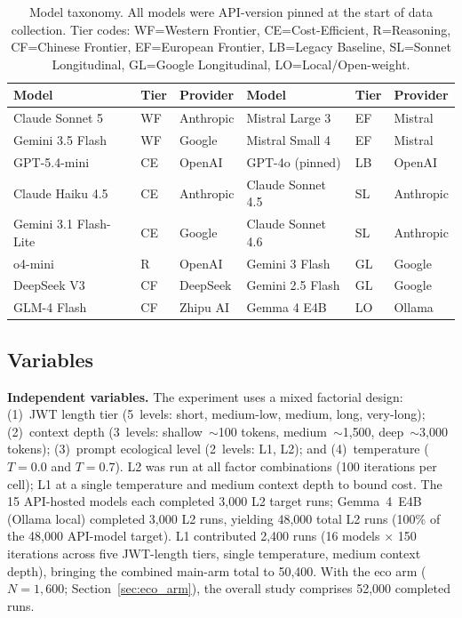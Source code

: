 \begin{table}[t]
\centering
\small
\vspace{-4pt}\caption{Model taxonomy. All models were API-version pinned at the start of
data collection. Tier codes: WF=Western Frontier, CE=Cost-Efficient,
R=Reasoning, CF=Chinese Frontier, EF=European Frontier, LB=Legacy Baseline,
SL=Sonnet Longitudinal, GL=Google Longitudinal, LO=Local/Open-weight.}
\label{tab:models}
\setlength{\tabcolsep}{6pt}
\begin{tabular}{@{}lll@{\qquad\qquad}lll@{}}
\toprule
\textbf{Model} & \textbf{Tier} & \textbf{Provider} &
\textbf{Model} & \textbf{Tier} & \textbf{Provider} \\
\midrule
Claude Sonnet 5       & WF & Anthropic  & Mistral Large 3       & EF & Mistral \\
Gemini 3.5 Flash      & WF & Google     & Mistral Small 4       & EF & Mistral \\
GPT-5.4-mini          & CE & OpenAI     & GPT-4o (pinned)       & LB & OpenAI \\
Claude Haiku 4.5      & CE & Anthropic  & Claude Sonnet 4.5     & SL & Anthropic \\
Gemini 3.1 Flash-Lite & CE & Google     & Claude Sonnet 4.6     & SL & Anthropic \\
o4-mini               & R  & OpenAI     & Gemini 3 Flash        & GL & Google \\
DeepSeek V3           & CF & DeepSeek   & Gemini 2.5 Flash      & GL & Google \\
GLM-4 Flash           & CF & Zhipu AI   & Gemma 4 E4B           & LO & Ollama \\
\bottomrule
\end{tabular}
\end{table}

\subsection{Variables}\label{sec:variables}

\textbf{Independent variables.}
The experiment uses a mixed factorial design:
(1)~JWT length tier (5~levels: short, medium-low, medium, long, very-long);
(2)~context depth (3~levels: shallow~$\sim$100 tokens, medium~$\sim$1{,}500,
    deep~$\sim$3{,}000 tokens);
(3)~prompt ecological level (2~levels: L1, L2);
and (4)~temperature ($T\!=\!0.0$ and $T\!=\!0.7$).
L2 was run at all factor combinations (100 iterations per cell); L1
at a single temperature and medium context depth to bound cost.
The 15 API-hosted models each completed 3{,}000 L2 target runs; Gemma~4~E4B
(Ollama local) completed 3{,}000 L2 runs, yielding 48{,}000 total L2 runs
(100\% of the 48{,}000 API-model target).
L1 contributed 2{,}400 runs (16 models $\times$ 150 iterations across five
JWT-length tiers, single temperature, medium context depth), bringing the
combined main-arm total to 50{,}400. With the eco arm ($N\!=\!1{,}600$;
Section~\ref{sec:eco_arm}), the overall study comprises 52{,}000 completed
runs.

